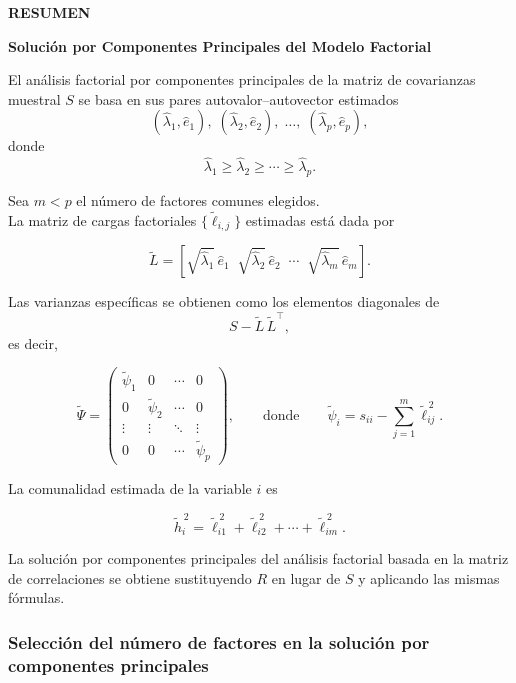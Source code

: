 \documentclass[
]{book}
\newenvironment{blackbox}{
  \definecolor{shadecolor}{HTML}{8B8989}%
  \color{white}
  \begin{shaded}}
 {\end{shaded}}
\begin{document}
\begin{blackbox}

\begin{center}
\textbf{RESUMEN}

\textbf{Solución por Componentes Principales del Modelo Factorial}

\end{center}

El análisis factorial por componentes principales de la matriz de covarianzas muestral \(S\) se basa en sus pares autovalor--autovector estimados
\[
(\hat{\lambda}_1, \hat{e}_1),\; (\hat{\lambda}_2, \hat{e}_2),\; \dots,\; (\hat{\lambda}_p, \hat{e}_p),
\]
donde
\[
\hat{\lambda}_1 \ge \hat{\lambda}_2 \ge \cdots \ge \hat{\lambda}_p.
\]

Sea \(m < p\) el número de factores comunes elegidos.\\
La matriz de cargas factoriales \(\{\widetilde{\ell}_{i,j}\}\) estimadas está dada por

\[
\widetilde{L}
=
\left[
\sqrt{\hat{\lambda}_1}\,\hat{e}_1
\;\;
\sqrt{\hat{\lambda}_2}\,\hat{e}_2
\;\;
\cdots
\;\;
\sqrt{\hat{\lambda}_m}\,\hat{e}_m
\right].
\]

Las varianzas específicas se obtienen como los elementos diagonales de
\[
S - \widetilde{L}\,\widetilde{L}^\top,
\]
es decir,

\[
\widetilde{\Psi}
=
\begin{pmatrix}
\tilde{\psi}_1 & 0 & \cdots & 0 \\
0 & \tilde{\psi}_2 & \cdots & 0 \\
\vdots & \vdots & \ddots & \vdots \\
0 & 0 & \cdots & \tilde{\psi}_p
\end{pmatrix},
\qquad
\text{donde}
\qquad
\tilde{\psi}_i
=
s_{ii} - \sum_{j=1}^m \tilde{\ell}_{ij}^{\,2}.
\]

La comunalidad estimada de la variable \(i\) es

\[
\tilde{h}_i^{\,2}
=
\tilde{\ell}_{i1}^{\,2}
+
\tilde{\ell}_{i2}^{\,2}
+
\cdots
+
\tilde{\ell}_{im}^{\,2}.
\]

La solución por componentes principales del análisis factorial basada en la matriz de correlaciones se obtiene sustituyendo \(R\) en lugar de \(S\) y aplicando las mismas fórmulas.

\end{blackbox}

\subsubsection{Selección del número de factores en la solución por componentes principales}\label{selecciuxf3n-del-nuxfamero-de-factores-en-la-soluciuxf3n-por-componentes-principales}
\end{document}
